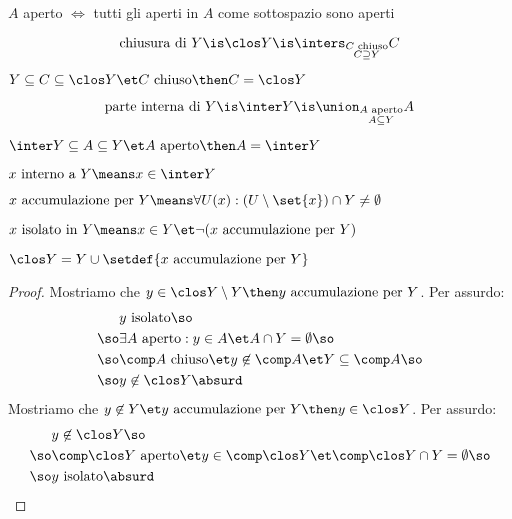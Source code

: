 
\begin{prop}
$A$ aperto $\iff$ tutti gli aperti in $A$ come sottospazio sono aperti
\end{prop}


\begin{defn}
\[\text{chiusura di }Y\is\clos Y\is\inters_{\substack{C\text{ chiuso}\\C\supseteq Y}}C\]
\end{defn}

\begin{prop}
$Y\subseteq C\subseteq\clos Y\et C\text{ chiuso}\then C=\clos Y$
\end{prop}

\begin{defn}
\[\text{parte interna di }Y\is\inter Y\is\union_{\substack{A\text{ aperto}\\A\subseteq Y}}A\]
\end{defn}

\begin{prop}
$\inter Y\subseteq A\subseteq Y\et A\text{ aperto}\then A=\inter Y$
\end{prop}

\begin{defn}
$x\text{ interno a }Y\means x\in\inter Y$
\end{defn}

\begin{defn}
$x\text{ accumulazione per }Y\means\forall U(x):(U\setminus\set{x})\cap Y\neq\emptyset$
\end{defn}

\begin{defn}
$x\text{ isolato in }Y\means x\in Y\et\neg(x\text{ accumulazione per }Y)$
\end{defn}

\begin{lemma}
$\clos Y=Y\cup\setdef{x\text{ accumulazione per }Y}$
\end{lemma}
\begin{proof}
Mostriamo che $y\in\clos Y\setminus Y\then y\text{ accumulazione per }Y$. Per assurdo:
\begin{align*}
&y\text{ isolato}\so\\
\so&\exists A\text{ aperto}:y\in A\et A\cap Y=\emptyset\so\\
\so&\comp A\text{ chiuso}\et y\not\in\comp A\et Y\subseteq\comp A\so\\
\so&y\not\in\clos Y\absurd
\end{align*}
Mostriamo che $y\not\in Y\et y\text{ accumulazione per }Y\then y\in\clos Y$. Per assurdo:
\begin{align*}
&y\not\in\clos Y\so\\
\so&\comp\clos Y\text{ aperto}\et y\in\comp\clos Y\et\comp\clos Y\cap Y=\emptyset\so\\
\so&y\text{ isolato}\absurd
\end{align*}
\end{proof}


